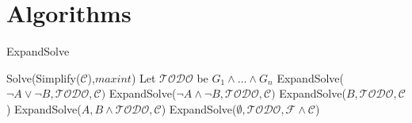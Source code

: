 \documentclass{llncs}
\begin{document}
\section{Algorithms}
\begin{algorithm2e}[H]\caption{ExpandSolve}
 \DontPrintSemicolon
{
 {
   \Return Solve(Simplify($\mathcal{C}$),$maxint$) \;
 }
 \Else 
 {
   Let $\mathcal{TODO}$ be $G_1 \land \dots \land  G_n$ \;
   \;
 }
}
 {
  ExpandSolve($\neg A \lor \neg B, \mathcal{TODO},\mathcal{C})$\;
}
 {
    ExpandSolve($\neg A \land \neg B, \mathcal{TODO},\mathcal{C})$\;
}
 {
  {
   \Return ExpandSolve($B,\mathcal{TODO},\mathcal{C}$) \;
  }
}
 {
  \Return ExpandSolve($A, B\land \mathcal{TODO},\mathcal{C}$) \;
}
\Else 
{
\Return ExpandSolve($\emptyset,\mathcal{TODO},\mathcal{F} \land \mathcal{C}$)
}
  \;
\end{algorithm2e}
\end{document}
